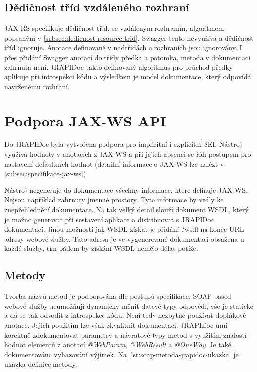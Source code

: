 \documentclass[11pt,twoside,a4paper]{book}
\begin{document}
\subsection{Dědičnost tříd vzdáleného rozhraní}

JAX-RS specifikuje dědičnost tříd, se vzdáleným rozhraním, algoritmem popsaným v
\ref{subsec:dedicnost-resource-trid}. Swagger tento nevyužívá a dědičnost tříd
ignoruje. Anotace definované v nadtřídách a rozhraních jsou ignorovány. I přes
přidání Swagger anotací do třídy předka a potomka, metoda v dokumentaci zahrnuta
není. JRAPIDoc takto definovaný algoritmus pro průchod předky aplikuje při
introspekci kódu a výsledkem je model dokumentace, který odpovídá navrženému
rozhraní.

\section{Podpora JAX-WS API}

Do JRAPIDoc byla vytvořena podpora pro implicitní i explicitní SEI. Nástroj
využívá hodnoty v anotacích z JAX-WS a při jejich absenci se řídí postupem pro
nastavení defaultních hodnot (detailní informace o JAX-WS lze nalézt v
\ref{subsec:specifikace-jax-ws}).

Nástroj negeneruje do dokumentace všechny informace, které definuje JAX-WS.
Nejsou například zahrnuty jmenné prostory.
Tyto informace by vedly ke znepřehlednění dokumentace. Na tak velký detail
slouží dokument WSDL, který je možno generovat při sestavení aplikace a
distribuovat s JRAPIDoc dokumentací. Jinou možností jak WSDL získat je přidání
?wsdl na konec URL adresy webové služby.
Tato adresa je ve vygenerované dokumentaci obsažena u každé služby, tím pádem by
získání WSDL nemělo dělat potíže.

\subsection{Metody}

Tvorba názvů metod je podporována dle postupů specifikace. SOAP-based webové
služby neumožňují dynamicky měnit datové typy odpovědí, vše je statické a dá se
tak odvodit z introspekce kódu. Není tedy nezbytné používat doplňkové anotace.
Jejich použitím lze však zkvalitnit dokumentaci. JRAPIDoc umí korektně
zdokumentovat parametry a návratové typy metod s využitím znalostí hodnot
elementů z anotací {\em @WebParam}, {\em @WebResult} a {\em @OneWay}. Je také
dokumentováno vyhazování výjimek.
Na \ref{lst:soap-metoda-jrapidoc-ukazka} je ukázka definice metody.
\end{document}
